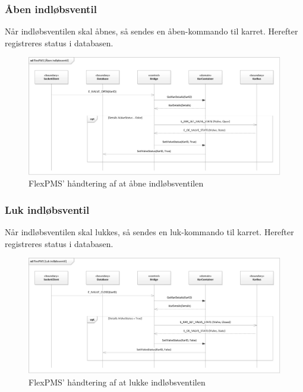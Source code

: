 \subsubsection{Åben indløbsventil}

Når indløbsventilen skal åbnes, så sendes en åben-kommando til karret. Herefter registreres status i databasen.

\begin{figure}[H]
	\centering
	\includegraphics[scale=.6]{SoftwareArkitektur/FlexPMS/Diagrammer/Case_OpenIValve.png}
	\caption{FlexPMS' håndtering af at åbne indløbsventilen}
	\label{photo:OpenOValveUseCase}
\end{figure}


\subsubsection{Luk indløbsventil}

Når indløbsventilen skal lukkes, så sendes en luk-kommando til karret. Herefter registreres status i databasen.

\begin{figure}[H]
	\centering
	\includegraphics[scale=.6]{SoftwareArkitektur/FlexPMS/Diagrammer/Case_CloseIValve.png}
	\caption{FlexPMS' håndtering af at lukke indløbsventilen}
	\label{photo:CloseOValveUseCase}
\end{figure}


